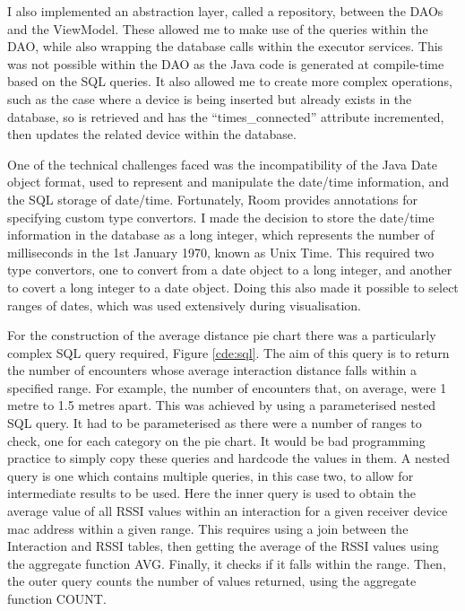\documentclass{l4proj}
\begin{document}
I also implemented an abstraction layer, called a repository, between the DAOs and the ViewModel. These allowed me to make use of the queries within the DAO, while also wrapping the database calls within the executor services. This was not possible within the DAO as the Java code is generated at compile-time based on the SQL queries. It also allowed me to create more complex operations, such as the case where a device is being inserted but already exists in the database, so is retrieved and has the “times\_connected” attribute incremented, then updates the related device within the database.

One of the technical challenges faced was the incompatibility of the Java Date object format, used to represent and manipulate the date/time information, and the SQL storage of date/time. Fortunately, Room provides annotations for specifying custom type convertors. I made the decision to store the date/time information in the database as a long integer, which represents the number of milliseconds in the 1st January 1970, known as Unix Time. This required two type convertors, one to convert from a date object to a long integer, and another to covert a long integer to a date object. Doing this also made it possible to select ranges of dates, which was used extensively during visualisation.

For the construction of the average distance pie chart there was a particularly complex SQL query required, Figure \ref{cde:sql}. The aim of this query is to return the number of encounters whose average interaction distance falls within a specified range. For example, the number of encounters that, on average, were 1 metre to 1.5 metres apart. This was achieved by using a parameterised nested SQL query. It had to be parameterised as there were a number of ranges to check, one for each category on the pie chart. It would be bad programming practice to simply copy these queries and hardcode the values in them. A nested query is one which contains multiple queries, in this case two, to allow for intermediate results to be used. Here the inner query is used to obtain the average value of all RSSI values within an interaction for a given receiver device mac address within a given range. This requires using a join between the Interaction and RSSI tables, then getting the average of the RSSI values using the aggregate function AVG. Finally, it checks if it falls within the range. Then, the outer query counts the number of values returned, using the aggregate function COUNT.
\end{document}
